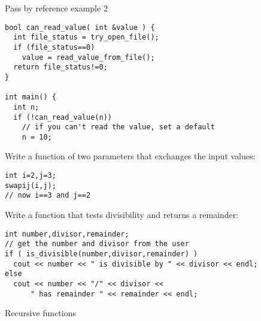 \begin{block}{Pass by reference example 2}
  \label{sl:pass-reference}
\begin{verbatim}
bool can_read_value( int &value ) {
  int file_status = try_open_file();
  if (file_status==0) 
    value = read_value_from_file();
  return file_status!=0;
}

int main() {
  int n;
  if (!can_read_value(n))
    // if you can't read the value, set a default
    n = 10;
\end{verbatim}
\end{block}

\begin{exercise}
  \label{ex:swap}
  Write a function  of two parameters that exchanges the input values:
\begin{verbatim}
int i=2,j=3;
swapij(i,j);
// now i==3 and j==2
\end{verbatim}
\end{exercise}

\begin{exercise}
  \label{ex:div-remain}
  Write a function that tests divisibility and returns a remainder:

{\small
\begin{verbatim}
int number,divisor,remainder;
// get the number and divisor from the user
if ( is_divisible(number,divisor,remainder) )
  cout << number << " is divisible by " << divisor << endl;
else
  cout << number << "/" << divisor <<
      " has remainder " << remainder << endl;
\end{verbatim}
}
\end{exercise}

 {Recursive functions}
\label{sec:recursion}

